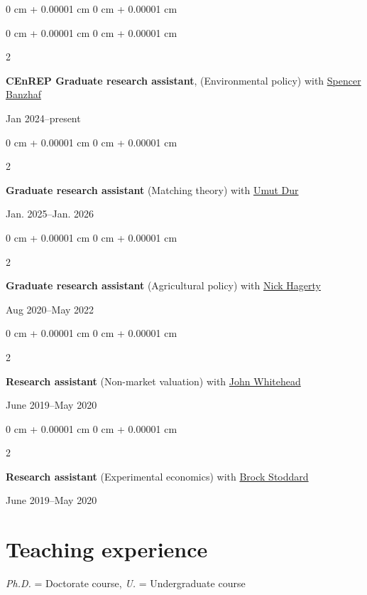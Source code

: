 \documentclass[12pt]{article}
\newenvironment{onecolentry}{
	\begin{adjustwidth}{
			0 cm + 0.00001 cm
		}{
			0 cm + 0.00001 cm
		}
	}
	{
	\end{adjustwidth}
} %
\newenvironment{paper}{
	\begin{onecolentry}
	\begin{hangingpar}
}{
	\end{hangingpar}
	\end{onecolentry}
	\smallskip
} %
\newenvironment{twocolentry}[2][]{
	\onecolentry
	\def\secondColumn{#2}
	\setcolumnwidth{\fill, 4.5 cm}
	\begin{paracol}{2}
	}{
		\switchcolumn \raggedleft \secondColumn
	\end{paracol}
	\endonecolentry
} %
\begin{document}
\begin{paper}
\begin{twocolentry}{Jan 2024--present}
	\begin{hangingpar}
		\textbf{CEnREP Graduate research assistant},
		(Environmental policy) with \href{https://spencerbanzhaf.wordpress.ncsu.edu/}{Spencer Banzhaf}
	\end{hangingpar}
\end{twocolentry}

\begin{twocolentry}{Jan. 2025--Jan. 2026}
	\begin{hangingpar}
		\textbf{Graduate research assistant} (Matching theory) with \href{https://sites.google.com/site/umutdur/home}{Umut Dur}
	\end{hangingpar}
\end{twocolentry}

\begin{twocolentry}{Aug 2020--May 2022}
	\begin{hangingpar}
		\textbf{Graduate research assistant} (Agricultural policy) with \href{https://www.nickhagerty.com/}{Nick Hagerty}
	\end{hangingpar}
\end{twocolentry}

\begin{twocolentry}{June 2019--May 2020}
	\begin{hangingpar}
		\textbf{Research assistant}
		(Non-market valuation) with \href{https://economics.appstate.edu/directory/john-whitehead-phd}{John Whitehead}
	\end{hangingpar}
\end{twocolentry}

\begin{twocolentry}{June 2019--May 2020}
	\begin{hangingpar}
		\textbf{Research assistant}
		(Experimental economics) with \href{https://sites.google.com/a/appstate.edu/brock_stoddard/home}{Brock Stoddard}
	\end{hangingpar}
\end{twocolentry}

\section{Teaching experience}
 {\footnotesize \textit{Ph.D.} = Doctorate course, \textit{U.} = Undergraduate course}


\end{paper}
\end{document}
